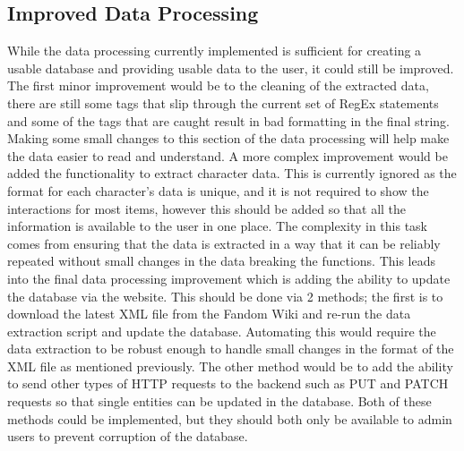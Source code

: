 \subsection*{Improved Data Processing}
While the data processing currently implemented is sufficient for creating a usable database and providing usable data to the user, 
it could still be improved. The first minor improvement would be to the cleaning of the extracted data, there are still some tags that slip 
through the current set of RegEx statements and some of the tags that are caught result in bad formatting in the final string. Making some small 
changes to this section of the data processing will help make the data easier to read and understand. A more complex improvement would be 
added the functionality to extract character data. This is currently ignored as the format for each character's data is unique, and it is not required 
to show the interactions for most items, however this should be added so that all the information is available to the user in one place. The complexity in this task 
comes from ensuring that the data is extracted in a way that it can be reliably repeated without small changes in the data breaking the functions. This leads into the final 
data processing improvement which is adding the ability to update the database via the website. This should be done via 2 methods; the first is to download the latest XML file 
from the Fandom Wiki and re-run the data extraction script and update the database. Automating this would require the data extraction to be robust enough to handle small changes in the format 
of the XML file as mentioned previously. The other method would be to add the ability to send other types of HTTP requests to the backend such as PUT and PATCH requests so that single entities can be updated 
in the database. Both of these methods could be implemented, but they should both only be available to admin users to prevent corruption of the database.
